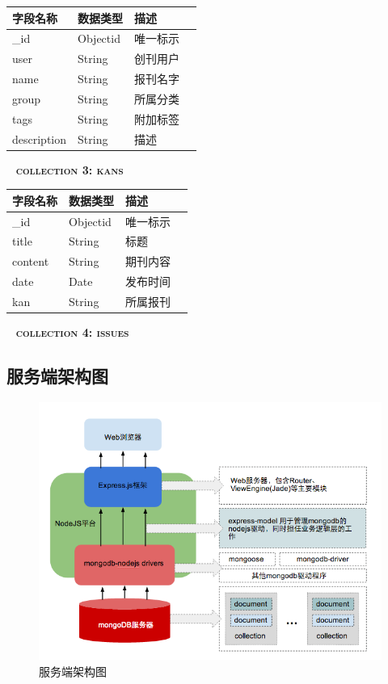 \begin{center}
	\begin{tabular}{ | l | l | l | l | }
		\hline
  	{\bf 字段名称} & {\bf 数据类型} & {\bf 描述} \\
  	\hline
  	\_id & Objectid & 唯一标示 \\
  	\hline
  	user & String & 创刊用户 \\
  	\hline
  	name & String & 报刊名字 \\
  	\hline
  	group & String & 所属分类 \\
  	\hline
  	tags & String & 附加标签 \\
  	\hline
  	description & String & 描述 \\
  	\hline
	\end{tabular}
	\par~
		\textsc{\bf collection 3: kans}
\end{center}

\begin{center}
	\begin{tabular}{ | l | l | l | l | }
		\hline
  	{\bf 字段名称} & {\bf 数据类型} & {\bf 描述} \\
  	\hline
  	\_id & Objectid & 唯一标示 \\
  	\hline
  	title & String & 标题 \\
  	\hline
  	content & String & 期刊内容 \\
  	\hline
  	date & Date & 发布时间 \\
  	\hline
  	kan & String & 所属报刊 \\
  	\hline
	\end{tabular}
	\par~
		\textsc{\bf collection 4: issues}
\end{center}

\subsection{服务端架构图}
\begin{figure}[h]
  \centering
    \includegraphics[width=1\textwidth]{./images/server-side-architecture.png}
  \caption{服务端架构图}
\end{figure}


\clearpage